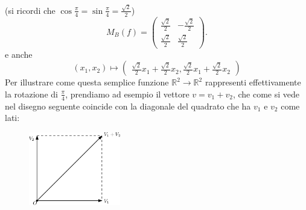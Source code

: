\begin{esempio}
\begin{enumerate}
    (si ricordi che $\cos\frac{\pi}{4}=\sin\frac{\pi}{4}=\frac{\sqrt{2}}{2}$)
    \begin{equation*}
      M_B(f)=
      \begin{pmatrix}
        \frac{\sqrt{2}}{2} & -\frac{\sqrt{2}}{2} \\
        \frac{\sqrt{2}}{2} & \frac{\sqrt{2}}{2}
      \end{pmatrix}.
    \end{equation*}
    e anche
    \begin{equation}
      (x_1,x_2)\mapsto
      \begin{pmatrix}
        \frac{\sqrt{2}}{2}x_1+\frac{\sqrt{2}}{2}x_2,\frac{\sqrt{2}}{2}x_1+\frac{\sqrt{2}}{2}x_2
      \end{pmatrix}
    \end{equation}
    Per illustrare come questa semplice funzione $\mathds{R}^2\to\mathds{R}^2$ rappresenti effettivamente la
    rotazione di $\frac{\pi}{4}$, prendiamo ad esempio il vettore $v=v_1+v_2$, che come si vede nel disegno
    seguente coincide con la diagonale del quadrato che ha $v_1$ e $v_2$ come lati:
    \begin{figure}[th]
      \centering
        \includegraphics[width=4cm]{img/finiti/imgex4-3-4.eps}
    \end{figure}


\end{enumerate}
\end{esempio}
